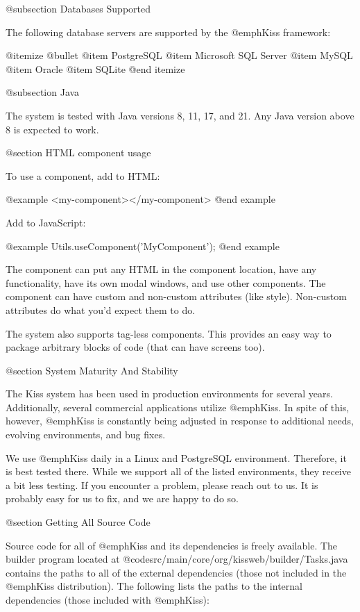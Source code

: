 @subsection Databases Supported


The following database servers are supported by the @emph{Kiss}
framework:

@itemize @bullet
@item
PostgreSQL
@item
Microsoft SQL Server
@item
MySQL
@item
Oracle
@item
SQLite
@end itemize


@subsection Java

The system is tested with Java versions 8, 11, 17, and 21.  Any Java version above 8
is expected to work.



@section HTML component usage
   
To use a component, add to HTML:

@example
<my-component></my-component>
@end example

Add to JavaScript:

@example
Utils.useComponent('MyComponent');
@end example
    
The component can put any HTML in the component location, have any
functionality, have its own modal windows, and use other components.
The component can have custom and non-custom attributes (like style).
Non-custom attributes do what you'd expect them to do.

The system also supports tag-less components.  This provides an easy
way to package arbitrary blocks of code (that can have screens too).

@section System Maturity And Stability

The Kiss system has been used in production environments for several
years.  Additionally, several commercial applications utilize @emph{Kiss}.
In spite of this, however, @emph{Kiss} is constantly being adjusted
in response to additional needs, evolving environments, and bug fixes.

We use @emph{Kiss} daily in a Linux and PostgreSQL environment.
Therefore, it is best tested there.  While we support all of the listed
environments, they receive a bit less testing.  If you encounter a problem,
please reach out to us.  It is probably easy for us to fix, and we
are happy to do so.


@section Getting All Source Code

Source code for all of @emph{Kiss} and its dependencies is freely
available.  The builder program located at
@code{src/main/core/org/kissweb/builder/Tasks.java} contains the paths
to all of the external dependencies (those not included in the
@emph{Kiss} distribution).  The following lists the paths to the
internal dependencies (those included with @emph{Kiss}):

